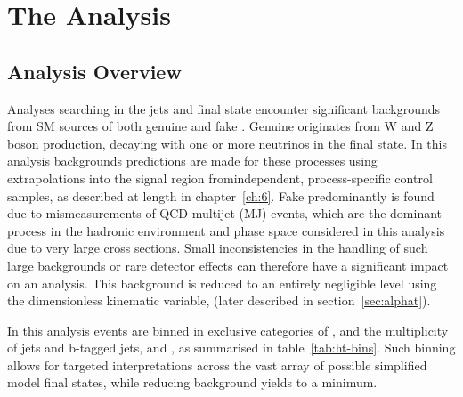 \chapter{The \alphat Analysis}
\label{ch:5}

\ifpdf
    \graphicspath{{Chapter5/Figs/Raster/}{Chapter5/Figs/PDF/}{Chapter5/Figs/}}
\else
    \graphicspath{{Chapter5/Figs/Vector/}{Chapter5/Figs/}}
\fi


\section{Analysis Overview}  %
\label{sec:selection_analysis_overview}

Analyses searching in the jets and \met final state encounter significant 
backgrounds from SM sources of both genuine and fake \met. Genuine \met 
originates from W and Z boson production, decaying with one or more neutrinos in
the final state. In this analysis backgrounds predictions are made for these
processes using 
extrapolations into the signal region fromindependent, process-specific control
samples, as described at length in chapter~\ref{ch:6}.
Fake \met predominantly is found due to mismeasurements of QCD 
multijet (MJ) events, which are the dominant process in the hadronic environment and 
phase space considered in this analysis due to very large cross sections. 
Small inconsistencies in the handling of such large backgrounds or rare detector
effects can therefore 
have a significant impact on an analysis. This background is reduced to an 
entirely negligible level using the dimensionless kinematic variable, \alphat
(later described in section~\ref{sec:alphat}).


In this analysis events are binned in exclusive categories of \HT, 
and the multiplicity of jets and b-tagged jets,  
\nj and \nb, as summarised in table~\ref{tab:ht-bins}. Such binning allows for
targeted interpretations across the vast array of
possible simplified model final states, while reducing background yields to a 
minimum.


